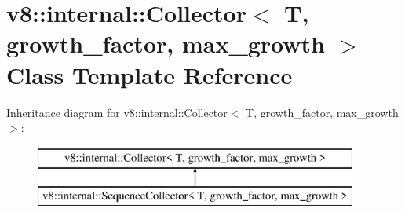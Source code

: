\hypertarget{classv8_1_1internal_1_1_collector}{}\section{v8\+:\+:internal\+:\+:Collector$<$ T, growth\+\_\+factor, max\+\_\+growth $>$ Class Template Reference}
\label{classv8_1_1internal_1_1_collector}
Inheritance diagram for v8\+:\+:internal\+:\+:Collector$<$ T, growth\+\_\+factor, max\+\_\+growth $>$\+:\begin{figure}[H]
\begin{center}
\leavevmode
\includegraphics[height=2.000000cm]{classv8_1_1internal_1_1_collector}
\end{center}
\end{figure}
